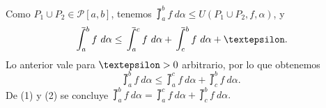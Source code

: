   Como $P_1\cup P_2\in\mathcal{P}\left[a,b\right]$, tenemos $\upint_a^b f\ d\alpha \leq U\left(P_1\cup P_2,f,\alpha\right)$, y
  \begin{equation*}
    \upint_a^b f\ d\alpha \leq \upint_a^c f\ d\alpha + \upint_c^b f\ d\alpha +\text{\textepsilon}.
  \end{equation*}
  Lo anterior vale para $\text{\textepsilon}>0$ arbitrario, por lo que obtenemos
  \setcounter{equation}{1}
  \begin{equation}
    \upint_a^b f\ d\alpha \leq \upint_a^c f\ d\alpha + \upint_c^b f\ d\alpha.
  \end{equation}
  De (1) y (2) se concluye $\upint_a^b f\ d\alpha = \upint_a^c f\ d\alpha + \upint_c^b f\ d\alpha.$
